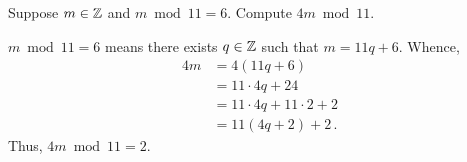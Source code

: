 \guard




\begin{exmp}
\label{exmp:modularArithmetic}
  Suppose $m\in\mathbb{Z}$ and $m\bmod 11=6$.
  Compute $4m\bmod 11$.

  $m\bmod 11=6$ means there exists $q\in\mathbb{Z}$ such that $m=11q+6$.
  Whence,
  \begin{align*}
    4m  &= 4(11q+6) \\
        &= 11\cdot4q + 24 \\
        &= 11\cdot4q + 11\cdot 2 + 2 \\
        &= 11(4q+2)+2\,.
  \end{align*}
  Thus, $4m\bmod 11=2$.
\end{exmp}
